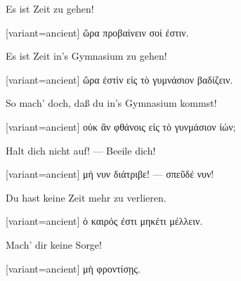 \indent Es ist Zeit zu gehen!

\switchcolumn

\begin{greek}[variant=ancient]%
ὥρα προβαίνειν σοί ἐστιν.

\end{greek}%
\switchcolumn*

Es ist Zeit in's Gymnasium zu gehen!

\switchcolumn

\begin{greek}[variant=ancient]%
ὥρα ἐστὶν εἰς τὸ γυμνάσιον βαδίζειν.

\end{greek}%
\switchcolumn*

So mach' doch, daß du in's Gymnasium kommst!

\switchcolumn

\begin{greek}[variant=ancient]%
οὐκ ἂν φθάνοις εἰς τὸ γυνμάσιον ἰών;

\end{greek}%
\switchcolumn*

Halt dich nicht auf! --- Beeile dich!

\switchcolumn

\begin{greek}[variant=ancient]%
μή νυν διάτριβε! --- σπεῦδέ νυν!

\end{greek}%
\switchcolumn*

Du hast keine Zeit mehr zu verlieren.

\switchcolumn

\begin{greek}[variant=ancient]%
ὁ καιρός ἐστι μηκέτι μέλλειν.

\end{greek}%
\switchcolumn*

Mach' dir keine Sorge!

\switchcolumn

\begin{greek}[variant=ancient]%
μὴ φροντίσῃς.

\end{greek}%
\switchcolumn*

